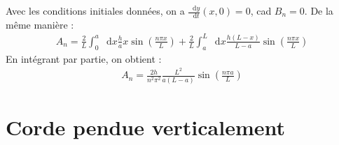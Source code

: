 \documentclass{report}
\newcommand*\dif{\mathop{}\!\mathrm{d}}
\begin{document}
\begin{itemize}
	Avec les conditions initiales données, on a $\frac{\dif y}{\dif t}(x,0)=0$, cad $B_n=0$. De la même manière :
	\begin{align*}
		A_n=\frac{2}{L}\int_0^a\dif x \frac{h}{a}x\sin\left(\frac{n\pi x}{L} \right) + \frac{2}{L}\int_a^L\dif x \frac{h(L-x)}{L-a}\sin\left(\frac{n\pi x}{L} \right) 
	\end{align*}
	En intégrant par partie, on obtient :
	\begin{align*}
		A_n=\frac{2h}{n^2\pi^2}\frac{L^2}{a(L-a)}\sin\left(\frac{n\pi a}{L} \right) 
	\end{align*}

\end{itemize}

\section*{Corde pendue verticalement}
\end{document}
